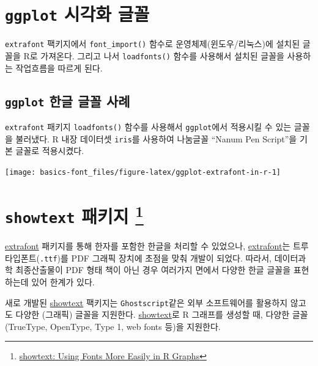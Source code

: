 \documentclass[
]{book}
\begin{document}
\hypertarget{r-viz-font}{%
\section{\texorpdfstring{\texttt{ggplot} 시각화 글꼴}{ggplot 시각화 글꼴}}\label{r-viz-font}}

\texttt{extrafont} 팩키지에서 \texttt{font\_import()} 함수로 운영체제(윈도우/리눅스)에
설치된 글꼴을 R로 가져온다. 그리고 나서 \texttt{loadfonts()} 함수를 사용해서
설치된 글꼴을 사용하는 작업흐름을 따르게 된다.

\hypertarget{font-viz-font-example}{%
\subsection{\texorpdfstring{\texttt{ggplot} 한글 글꼴 사례}{ggplot 한글 글꼴 사례}}\label{font-viz-font-example}}

\texttt{extrafont} 패키지 \texttt{loadfonts()} 함수를 사용해서 \texttt{ggplot}에서 적용시킬 수 있는
글꼴을 불러냈다. R 내장 데이터셋 \texttt{iris}를 사용하여 나눔글꼴 ``Nanum Pen Script''을 기본 글꼴로 적용시켰다.

\begin{center}\texttt{[image: basics-font\_files/figure-latex/ggplot-extrafont-in-r-1]} \end{center}

\hypertarget{font-showtext}{%
\section[\texttt{showtext} 패키지 ]{\texorpdfstring{\texttt{showtext} 패키지 \footnote{\href{https://cran.rstudio.com/web/packages/showtext/index.html}{showtext: Using Fonts More Easily in R
  Graphs}}}{showtext 패키지 }}\label{font-showtext}}

\href{https://github.com/wch/extrafont}{extrafont} 패키지를 통해 한자를
포함한 한글을 처리할 수 있었으나, \href{https://github.com/wch/extrafont}{extrafont}는 트루타입폰트(\texttt{.ttf})를
PDF 그래픽 장치에 초점을 맞춰 개발이 되었다. 따라서, 데이터과학
최종산출물이 PDF 형태 책이 아닌 경우 여러가지 면에서 다양한 한글 글꼴을
표현하는데 있어 한계가 있다.

새로 개발된 \href{https://cran.rstudio.com/web/packages/showtext/index.html}{showtext}
팩키지는 \texttt{Ghostscript}같은 외부 소프트웨어를 활용하지 않고도 다양한
(그래픽) 글꼴을 지원한다. \href{https://cran.rstudio.com/web/packages/showtext/index.html}{showtext}로
R 그래프를 생성할 때, 다양한 글꼴(TrueType, OpenType, Type 1, web fonts
등)을 지원한다.
\end{document}
